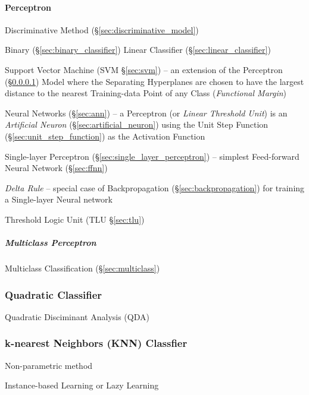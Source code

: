 \paragraph{Perceptron}\label{sec:perceptron}\hfill

Discriminative Method (\S\ref{sec:discriminative_model})

Binary (\S\ref{sec:binary_classifier}) Linear Classifier
(\S\ref{sec:linear_classifier})

\fist Support Vector Machine (SVM \S\ref{sec:svm}) -- an extension of the
Perceptron (\S\ref{sec:perceptron}) Model where the Separating Hyperplanes are
chosen to have the largest distance to the nearest Training-data Point of any
Class (\emph{Functional Margin})

\fist Neural Networks (\S\ref{sec:ann}) -- a Perceptron (or \emph{Linear
  Threshold Unit}) is an \emph{Artificial Neuron}
(\S\ref{sec:artificial_neuron}) using the Unit Step Function
(\S\ref{sec:unit_step_function}) as the Activation Function

\fist Single-layer Perceptron (\S\ref{sec:single_layer_perceptron})
-- simplest Feed-forward Neural Network (\S\ref{sec:ffnn})

\emph{Delta Rule} -- special case of Backpropagation
(\S\ref{sec:backpropagation}) for training a Single-layer Neural network

\fist Threshold Logic Unit (TLU \S\ref{sec:tlu})



\subparagraph{Multiclass Perceptron}\label{sec:multiclass_perceptron}\hfill

\fist Multiclass Classification (\S\ref{sec:multiclass})



\subsubsection{Quadratic Classifier}\label{sec:quadratic_classifier}

Quadratic Disciminant Analysis (QDA)



\subsubsection{k-nearest Neighbors (KNN) Classfier}\label{sec:knn_classifier}

Non-parametric method

Instance-based Learning or Lazy Learning


